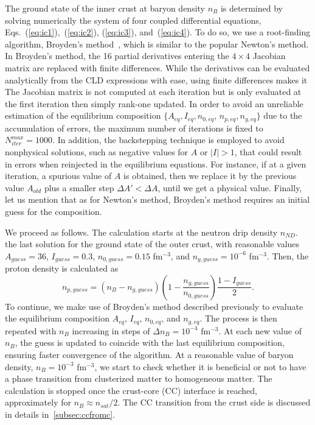 The ground state of the inner crust at baryon density $n_B$ 
is determined by solving numerically the system of four coupled
differential equations, Eqs.~(\ref{eq:ic1}),~(\ref{eq:ic2}), (\ref{eq:ic3}),
and~(\ref{eq:ic4}). To do so, we use a root-finding algorithm, Broyden's
method~\cite{Broyden1965}, which is similar to the popular Newton's method. In 
Broyden's method, the 16 partial derivatives entering the $4\times 4$ Jacobian 
matrix are replaced with finite differences. While the derivatives can be
evaluated analytically from the CLD expressions with ease, using finite
differences makes it  The Jacobian matrix 
is not computed at each iteration but is only evaluated at the first iteration 
then simply rank-one updated. In order to avoid an unreliable estimation of the
equilibrium composition $\{A_{eq},I_{eq},n_{0,eq}$, $n_{p,eq},n_{g,eq}\}$ due to
the accumulation of errors, the maximum number of iterations is fixed to
$N_{iter}^{max} = 1000$.
In addition, the backstepping technique is employed to avoid nonphysical solutions,
such as negative values for $A$ or $|I| > 1$, that could result in
errors when reinjected in the equilibrium equations. For instance, if at a given 
iteration, a spurious value of $A$ is obtained, then we replace it by the
previous value $A_{old}$ plus a smaller step $\Delta A' < \Delta A$, until we 
get a physical value. Finally, let us mention that as for Newton's 
method, Broyden's method requires an initial guess for the composition.

We proceed as follows. The calculation starts at the neutron drip density
$n_{ND}$.  the last 
  solution for the ground state of the outer crust, with reasonable values 
$A_{guess} = 36$, $I_{guess} = 0.3$, $n_{0,guess} = 0.15$ fm$^{-3}$, and 
$n_{g,guess} = 10^{-6}$ fm$^{-3}$. Then, the proton density is calculated
as
%
\begin{equation}
  n_{p,guess} =
  (n_B-n_{g,guess})\left(1-\frac{n_{g,guess}}{n_{0,guess}}\right)
  \frac{1-I_{guess}}{2}.
\end{equation}
%
To continue, we make use of Broyden's method described previously to evaluate 
the equilibrium composition $A_{eq}$, $I_{eq}$, $n_{0,eq}$, and $n_{g,eq}$. The
process is then repeated with $n_B$ increasing in steps of 
$\Delta n_B = 10^{-4}$ fm$^{-3}$. At each new value of $n_B$, the guess
is updated to coincide with the last equilibrium composition, ensuring faster
convergence of the algorithm. At a reasonable value of baryon density, $n_B =
10^{-3}$ fm$^{-3}$, we start to check whether it is beneficial or not to have a
phase transition from clusterized matter to homogeneous matter. The calculation 
is stopped once the crust-core (CC) interface is reached, approximately for $n_B
\approx n_{sat}/2$. The CC transition from the crust side is discussed 
in details in~\ref{subsec:ccfromc}.

